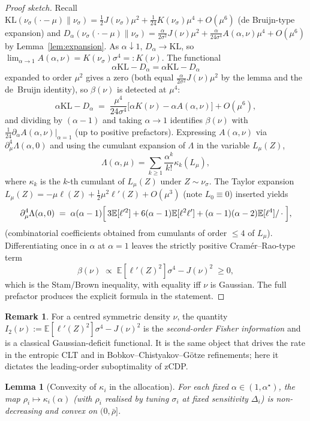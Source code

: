 \documentclass[11pt]{article}
\newtheorem{lemma}[theorem]{Lemma}
\theoremstyle{definition}
\newtheorem{remark}[theorem]{Remark}
\newcommand{\E}{\mathbb{E}}
\newcommand{\KL}{\mathrm{KL}}
\begin{document}
\begin{proof}[Proof sketch]
Recall $\KL(\nu_\sigma(\cdot-\mu)\|\nu_\sigma)=\frac12 J(\nu_\sigma)\mu^2+\frac{1}{24}K(\nu_\sigma)\mu^4+O(\mu^6)$ (de Bruijn-type expansion) and
$D_\alpha(\nu_\sigma(\cdot-\mu)\|\nu_\sigma)=\frac{\alpha}{2\sigma^2}J(\nu)\mu^2+\frac{\alpha}{24\sigma^4}A(\alpha,\nu)\mu^4+O(\mu^6)$ by Lemma~\ref{lem:expansion}. As $\alpha\downarrow 1$, $D_\alpha\to\KL$, so $\lim_{\alpha\to 1}A(\alpha,\nu)=K(\nu_\sigma)\sigma^4=:K(\nu)$. The functional
\[
\alpha\KL-D_\alpha=\alpha\KL-D_\alpha
\]
expanded to order $\mu^2$ gives a zero (both equal $\frac{\alpha}{2\sigma^2}J(\nu)\mu^2$ by the lemma and the de~Bruijn identity), so $\beta(\nu)$ is detected at $\mu^4$:
\[
\alpha\KL-D_\alpha\;=\;\frac{\mu^4}{24\sigma^4}\bigl[\alpha K(\nu)-\alpha A(\alpha,\nu)\bigr]+O(\mu^6),
\]
and dividing by $(\alpha-1)$ and taking $\alpha\to 1$ identifies $\beta(\nu)$ with $\frac{1}{24}\partial_\alpha A(\alpha,\nu)|_{\alpha=1}$ (up to positive prefactors). Expressing $A(\alpha,\nu)$ via $\partial_\mu^4\Lambda(\alpha,0)$ and using the cumulant expansion of $\Lambda$ in the variable $L_\mu(Z)$,
\[
\Lambda(\alpha,\mu)=\sum_{k\ge 1}\frac{\alpha^k}{k!}\kappa_k(L_\mu),
\]
where $\kappa_k$ is the $k$-th cumulant of $L_\mu(Z)$ under $Z\sim\nu_\sigma$. The Taylor expansion $L_\mu(Z)=-\mu\ell(Z)+\tfrac12\mu^2\ell'(Z)+O(\mu^3)$ (note $L_0\equiv 0$) inserted yields
\[
\partial_\mu^4\Lambda(\alpha,0)\;=\;\alpha(\alpha-1)\Bigl[\,3\E[\ell'^2]+6(\alpha-1)\E[\ell^2\ell']+(\alpha-1)(\alpha-2)\E[\ell^4]/\,\cdot\;\Bigr],
\]
(combinatorial coefficients obtained from cumulants of order $\le 4$ of $L_\mu$). Differentiating once in $\alpha$ at $\alpha=1$ leaves the strictly positive Cram\'er--Rao-type term
\[
\beta(\nu)\;\propto\;\E[\ell'(Z)^2]\sigma^4-J(\nu)^2\;\ge 0,
\]
which is the Stam/Brown inequality, with equality iff $\nu$ is Gaussian. The full prefactor produces the explicit formula in the statement.
\end{proof}

\begin{remark}
For a centred symmetric density $\nu$, the quantity $I_2(\nu):=\E[\ell'(Z)^2]\sigma^4-J(\nu)^2$ is the \emph{second-order Fisher information} and is a classical Gaussian-deficit functional. It is the same object that drives the rate in the entropic CLT and in Bobkov--Chistyakov--G\"otze refinements; here it dictates the leading-order suboptimality of zCDP.
\end{remark}

\begin{lemma}[Convexity of $\kappa_i$ in the allocation]\label{lem:convex}
For each fixed $\alpha\in(1,\alpha^\star)$, the map $\rho_i\mapsto \kappa_i(\alpha)$ (with $\rho_i$ realised by tuning $\sigma_i$ at fixed sensitivity $\Delta_i$) is non-decreasing and convex on $(0,\bar\rho]$.
\end{lemma}
\end{document}
